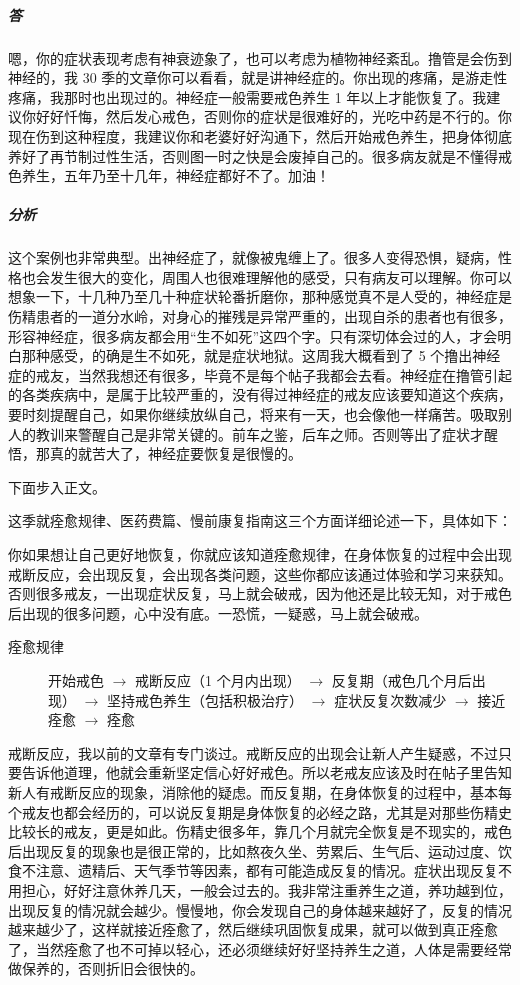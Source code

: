 \documentclass[fontset=founder]{ctexart}
\begin{document}
\begin{enumerate}
    \subparagraph{答} 嗯，你的症状表现考虑有神衰迹象了，也可以考虑为植物神经紊乱。撸管是会伤到神经的，我 30 季的文章你可以看看，就是讲神经症的。你出现的疼痛，是游走性疼痛，我那时也出现过的。神经症一般需要戒色养生 1 年以上才能恢复了。我建议你好好忏悔，然后发心戒色，否则你的症状是很难好的，光吃中药是不行的。你现在伤到这种程度，我建议你和老婆好好沟通下，然后开始戒色养生，把身体彻底养好了再节制过性生活，否则图一时之快是会废掉自己的。很多病友就是不懂得戒色养生，五年乃至十几年，神经症都好不了。加油！
    \subparagraph{分析} 这个案例也非常典型。出神经症了，就像被鬼缠上了。很多人变得恐惧，疑病，性格也会发生很大的变化，周围人也很难理解他的感受，只有病友可以理解。你可以想象一下，十几种乃至几十种症状轮番折磨你，那种感觉真不是人受的，神经症是伤精患者的一道分水岭，对身心的摧残是异常严重的，出现自杀的患者也有很多，形容神经症，很多病友都会用“生不如死”这四个字。只有深切体会过的人，才会明白那种感受，的确是生不如死，就是症状地狱。这周我大概看到了 5 个撸出神经症的戒友，当然我想还有很多，毕竟不是每个帖子我都会去看。神经症在撸管引起的各类疾病中，是属于比较严重的，没有得过神经症的戒友应该要知道这个疾病，要时刻提醒自己，如果你继续放纵自己，将来有一天，也会像他一样痛苦。吸取别人的教训来警醒自己是非常关键的。前车之鉴，后车之师。否则等出了症状才醒悟，那真的就苦大了，神经症要恢复是很慢的。
\end{enumerate}

下面步入正文。

这季就痊愈规律、医药费篇、慢前康复指南这三个方面详细论述一下，具体如下：

你如果想让自己更好地恢复，你就应该知道痊愈规律，在身体恢复的过程中会出现戒断反应，会出现反复，会出现各类问题，这些你都应该通过体验和学习来获知。否则很多戒友，一出现症状反复，马上就会破戒，因为他还是比较无知，对于戒色后出现的很多问题，心中没有底。一恐慌，一疑惑，马上就会破戒。

\begin{description}
    \item[痊愈规律]
    开始戒色 $\to$ 戒断反应（1 个月内出现） $\to$ 反复期（戒色几个月后出现） $\to$ 坚持戒色养生（包括积极治疗） $\to$ 症状反复次数减少 $\to$ 接近痊愈 $\to$ 痊愈
\end{description}

戒断反应，我以前的文章有专门谈过。戒断反应的出现会让新人产生疑惑，不过只要告诉他道理，他就会重新坚定信心好好戒色。所以老戒友应该及时在帖子里告知新人有戒断反应的现象，消除他的疑虑。而反复期，在身体恢复的过程中，基本每个戒友也都会经历的，可以说反复期是身体恢复的必经之路，尤其是对那些伤精史比较长的戒友，更是如此。伤精史很多年，靠几个月就完全恢复是不现实的，戒色后出现反复的现象也是很正常的，比如熬夜久坐、劳累后、生气后、运动过度、饮食不注意、遗精后、天气季节等因素，都有可能造成反复的情况。症状出现反复不用担心，好好注意休养几天，一般会过去的。我非常注重养生之道，养功越到位，出现反复的情况就会越少。慢慢地，你会发现自己的身体越来越好了，反复的情况越来越少了，这样就接近痊愈了，然后继续巩固恢复成果，就可以做到真正痊愈了，当然痊愈了也不可掉以轻心，还必须继续好好坚持养生之道，人体是需要经常做保养的，否则折旧会很快的。
\end{document}
